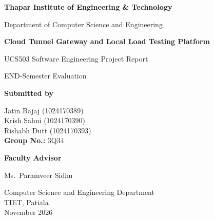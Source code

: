 \documentclass[11pt,a4paper]{report}
\begin{document}
\begin{titlepage}
\centering
\vspace*{0.6cm}
{\Large\bfseries Thapar Institute of Engineering \& Technology\par}
\vspace{0.3cm}
{\large Department of Computer Science and Engineering\par}
\vspace{1.6cm}

{\LARGE\bfseries Cloud Tunnel Gateway and Local Load Testing Platform\par}
\vspace{0.5cm}
{\large UCS503 Software Engineering Project Report\par}
{\normalsize END-Semester Evaluation\par}
\vspace{1.8cm}

{\bfseries Submitted by\par}
\vspace{0.4cm}
Jatin Bajaj \quad (1024170389)\\[4pt]
Krish Sahni \quad (1024170390)\\[4pt]
Rishabh Dutt \quad (1024170393)\\[10pt]
\vspace{0.4cm}
{\bfseries Group No.:} 3Q34\\[8pt]

\vspace{1.2cm}
{\bfseries Faculty Advisor\par}
\vspace{0.3cm}
Ms.\ Paramveer Sidhu\par

\vfill
{\normalsize Computer Science and Engineering Department\\
TIET, Patiala\\
November 2026\par}
\end{titlepage}

\tableofcontents
\clearpage
{}

\end{document}
